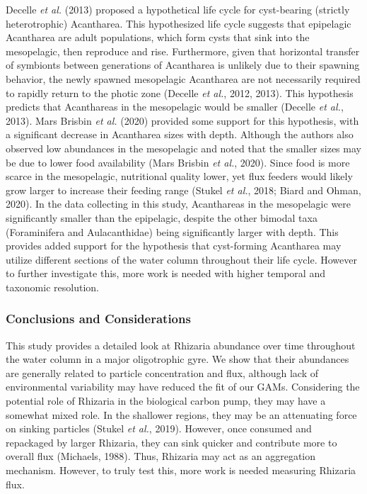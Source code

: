 \documentclass[
]{article}
\begin{document}
Decelle \emph{et al.} (2013) proposed a hypothetical life cycle for
cyst-bearing (strictly heterotrophic) Acantharea. This hypothesized life
cycle suggests that epipelagic Acantharea are adult populations, which
form cysts that sink into the mesopelagic, then reproduce and rise.
Furthermore, given that horizontal transfer of symbionts between
generations of Acantharea is unlikely due to their spawning behavior,
the newly spawned mesopelagic Acantharea are not necessarily required to
rapidly return to the photic zone (Decelle \emph{et al.}, 2012, 2013).
This hypothesis predicts that Acanthareas in the mesopelagic would be
smaller (Decelle \emph{et al.}, 2013). Mars Brisbin \emph{et al.} (2020)
provided some support for this hypothesis, with a significant decrease
in Acantharea sizes with depth. Although the authors also observed low
abundances in the mesopelagic and noted that the smaller sizes may be
due to lower food availability (Mars Brisbin \emph{et al.}, 2020). Since
food is more scarce in the mesopelagic, nutritional quality lower, yet
flux feeders would likely grow larger to increase their feeding range
(Stukel \emph{et al.}, 2018; Biard and Ohman, 2020). In the data
collecting in this study, Acanthareas in the mesopelagic were
significantly smaller than the epipelagic, despite the other bimodal
taxa (Foraminifera and Aulacanthidae) being significantly larger with
depth. This provides added support for the hypothesis that cyst-forming
Acantharea may utilize different sections of the water column throughout
their life cycle. However to further investigate this, more work is
needed with higher temporal and taxonomic resolution.

\subsubsection{Conclusions and
Considerations}\label{conclusions-and-considerations}

This study provides a detailed look at Rhizaria abundance over time
throughout the water column in a major oligotrophic gyre. We show that
their abundances are generally related to particle concentration and
flux, although lack of environmental variability may have reduced the
fit of our GAMs. Considering the potential role of Rhizaria in the
biological carbon pump, they may have a somewhat mixed role. In the
shallower regions, they may be an attenuating force on sinking particles
(Stukel \emph{et al.}, 2019). However, once consumed and repackaged by
larger Rhizaria, they can sink quicker and contribute more to overall
flux (Michaels, 1988). Thus, Rhizaria may act as an aggregation
mechanism. However, to truly test this, more work is needed measuring
Rhizaria flux.
\end{document}
